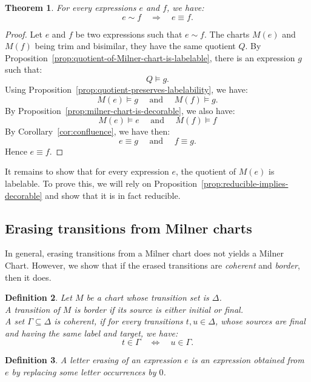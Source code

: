\documentclass{article}
\newtheorem{definition}{Definition}[section]
\newtheorem{theorem}[definition]{Theorem}
\begin{document}
\begin{theorem} For every expressions $e$ and $f$, we have:
  $$ e\sim f \quad \Longrightarrow \quad e\equiv f.$$
\end{theorem}
\begin{proof}
 Let $e$ and $f$ be two expressions such that $e\sim f$. The charts $M(e)$ and $M(f)$ being trim and bisimilar, they have the same quotient $Q$.  By Proposition~\ref{prop:quotient-of-Milner-chart-is-labelable}, there is an expression $g$ such that: $$Q\models g.$$
 Using Proposition~\ref{prop:quotient-preserves-labelability}, we have:
   $$M(e)\models g\quad \text{ and } \quad M(f)\models g.$$
  By Proposition~\ref{prop:milner-chart-is-decorable}, we also  have:
   $$M(e)\models e\quad \text{ and } \quad M(f)\models f$$
  By Corollary~\ref{cor:confluence}, we have then:
   $$e\equiv g\quad \text{ and } \quad f \equiv g.$$Hence $e\equiv f$.
\end{proof}

It remains to show that for every expression $e$, the quotient of $M(e)$ is labelable. To prove this, we will rely on Proposition~\ref{prop:reducible-implies-decorable} and show that it is in fact reducible.



\subsection{Erasing transitions from Milner charts}

In general, erasing transitions from a Milner chart does not yields a Milner Chart. However, we show that if the erased transitions are \emph{coherent} and \emph{border}, then it does.

\begin{definition} Let $M$ be a chart whose transition set is $\Delta$.~\\[-5pt]

  A transition of $M$ is \emph{border} if its source is either initial or final.~\\[-5pt]
  
  A set $\Gamma\subseteq \Delta$ is \emph{coherent}, if for every  transitions  
  $t, u\in \Delta$, whose sources are final and having the same label and target, we have:\vspace{-4pt}
   $$ t\in \Gamma \quad \Leftrightarrow \quad u\in \Gamma.$$ 
\end{definition}



\begin{definition}  
A \emph{letter erasing} of an expression $e$ is an expression obtained from $e$ by replacing some letter occurrences by $0$.
\end{definition}
\end{document}
